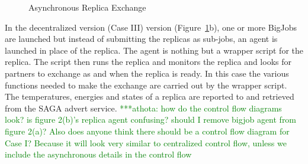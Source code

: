 \documentclass[a4paper,10pt]{article}
\newcommand{\athotanote}[1]{ {\textcolor{green} { ***athota: #1 }}}
\newcommand{\athotanote}[1]{}
\begin{document}
\begin{figure}
\centering
{}
\caption{\small Asynchronous Replica Exchange}
\label{fig:decentralized}
\end{figure}

In the decentralized version (Case III) version
(Figure~\ref{fig:decentralized}b), one or more BigJobs are launched
but instead of submitting the replicas as sub-jobs, an agent is
launched in place of the replica. The agent is nothing but a wrapper
script for the replica. The script then runs the replica and monitors
the replica and looks for partners to exchange as and when the replica
is ready. In this case the various functions needed to make the
exchange are carried out by the wrapper script. The temperatures,
energies and states of a replica are reported to and retrieved from
the SAGA advert service. \athotanote{how do the control flow diagrams
  look? is figure 2(b)'s replica agent confusing? should I remove
  bigjob agent from figure 2(a)? Also does anyone think there should
  be a control flow diagram for Case I?  Because it will look very
  similar to centralized control flow, unless we include the
  asynchronous details in the control flow }
\end{document}
